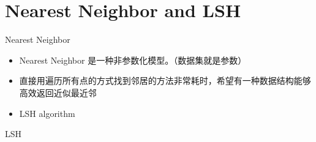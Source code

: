 \section{Nearest Neighbor and LSH}

\begin{frame}{Nearest Neighbor}
\begin{itemize}
    \item Nearest Neighbor 是一种非参数化模型。（数据集就是参数）
    \item 直接用遍历所有点的方式找到邻居的方法非常耗时，希望有一种数据结构能够高效返回近似最近邻
    \item LSH algorithm
\end{itemize}
\end{frame}

\begin{frame}{LSH}
    
\end{frame}